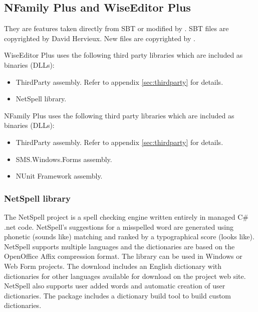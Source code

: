 \documentclass{article}
\begin{document}
\subsection{NFamily Plus and WiseEditor Plus}
They are features taken directly from SBT or modified by \lextm. SBT files are
copyrighted by David Hervieux. New files are copyrighted by \lextm.


WiseEditor Plus uses the following third party libraries which are included as
binaries (DLLs):

\begin{itemize}
  \item ThirdParty assembly. Refer to appendix \ref{sec:thirdparty} for details.

  \item NetSpell library.
\end{itemize}

NFamily Plus uses the following third party libraries which are included as
binaries (DLLs):

\begin{itemize}
  \item ThirdParty assembly. Refer to appendix \ref{sec:thirdparty} for details.
  \item SMS.Windows.Forms assembly.
  \item NUnit Framework assembly.
\end{itemize}

\subsubsection{NetSpell library}
The NetSpell project is a spell checking engine written entirely in managed C\#
.net code.  NetSpell's suggestions for a misspelled word are generated using
phonetic (sounds like) matching and ranked by a typographical score (looks
like).  NetSpell supports multiple languages and the dictionaries are based on
the OpenOffice Affix compression format. The library can be used in Windows or
Web Form projects. The download includes an English dictionary with
dictionaries for other languages available for download on the project web
site. NetSpell also supports user added words and automatic creation of user
dictionaries. The package includes a dictionary build tool to build custom
dictionaries.
\end{document}
